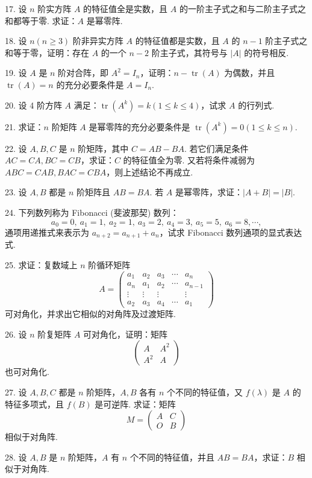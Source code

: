 \documentclass[UTF8, 12pt, fontset=fandol, oneside]{ctexart}
\begin{document}
17. 设 $n$ 阶实方阵 $A$ 的特征值全是实数，且 $A$ 的一阶主子式之和与二阶主子式之和都等于零. 求证：$A$ 是幂零阵.

18. 设 $n(n\geq 3)$ 阶非异实方阵 $A$ 的特征值都是实数，且 $A$ 的 $n-1$ 阶主子式之和等于零，证明：存在 $A$ 的一个 $n-2$ 阶主子式，其符号与 $|A|$ 的符号相反.

19. 设 $A$ 是 $n$ 阶对合阵，即 $A^2=I_n$，证明：$n-\operatorname{tr}(A)$ 为偶数，并且 $\operatorname{tr}(A)=n$ 的充分必要条件是 $A=I_n$.

20. 设 4 阶方阵 $A$ 满足：$\operatorname{tr}(A^k)=k(1\leq k\leq 4)$，试求 $A$ 的行列式.

21. 求证：$n$ 阶矩阵 $A$ 是幂零阵的充分必要条件是 $\operatorname{tr}(A^k)=0(1\leq k\leq n)$.

22. 设 $A,B,C$ 是 $n$ 阶矩阵，其中 $C=AB-BA$. 若它们满足条件 $AC=CA,BC=CB$，求证：$C$ 的特征值全为零. 又若将条件减弱为 $ABC=CAB,BAC=CBA$，则上述结论不再成立.

23. 设 $A,B$ 都是 $n$ 阶矩阵且 $AB=BA$. 若 $A$ 是幂零阵，求证：$|A+B|=|B|$.

24. 下列数列称为 Fibonacci (斐波那契) 数列：
\[
a_0=0,\ a_1=1,\ a_2=1,\ a_3=2,\ a_4=3,\ a_5=5,\ a_6=8,\cdots,
\]
通项用递推式来表示为 $a_{n+2}=a_{n+1}+a_n$，试求 Fibonacci 数列通项的显式表达式.

25. 求证：复数域上 $n$ 阶循环矩阵
\[
A=\left(\begin{array}{ccccc}
a_1 & a_2 & a_3 & \cdots & a_n\\
a_n & a_1 & a_2 & \cdots & a_{n-1}\\
\vdots & \vdots & \vdots & & \vdots\\
a_2 & a_3 & a_4 & \cdots & a_1
\end{array}\right)
\]
可对角化，并求出它相似的对角阵及过渡矩阵.

26. 设 $n$ 阶复矩阵 $A$ 可对角化，证明：矩阵
\[
\left(\begin{array}{cc}
A & A^2\\
A^2 & A
\end{array}\right)
\]
也可对角化.

27. 设 $A,B,C$ 都是 $n$ 阶矩阵，$A,B$ 各有 $n$ 个不同的特征值，又 $f(\lambda)$ 是 $A$ 的特征多项式，且 $f(B)$ 是可逆阵. 求证：矩阵
\[
M=\left(\begin{array}{cc}
A & C\\
O & B
\end{array}\right)
\]
相似于对角阵.

28. 设 $A,B$ 是 $n$ 阶矩阵，$A$ 有 $n$ 个不同的特征值，并且 $AB=BA$，求证：$B$ 相似于对角阵.
\end{document}
